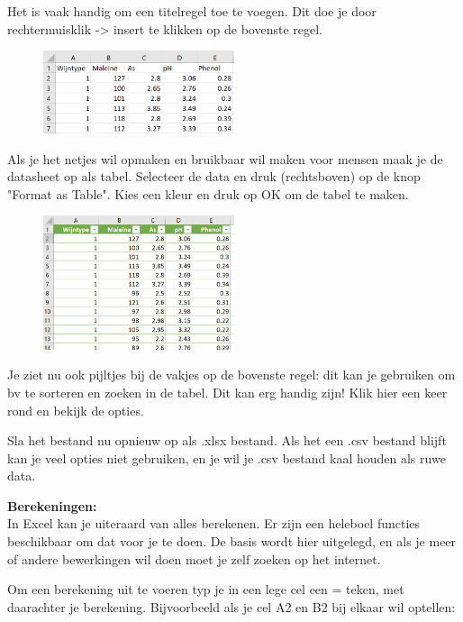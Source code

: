 Het is vaak handig om een titelregel toe te voegen. Dit doe je door rechtermuisklik -> insert te klikken op de bovenste regel.

\begin{figure}[h]
\begin{center}
\includegraphics[width=0.5\textwidth]{img/wijn2.png}
\end{center}
\end{figure}

Als je het netjes wil opmaken en bruikbaar wil maken voor mensen maak je de datasheet op als tabel. Selecteer de data en druk (rechtsboven) op de knop "Format as Table". Kies een kleur en druk op OK om de tabel te maken.
\begin{figure}[h]
\begin{center}
\includegraphics[width=0.5\textwidth]{img/wijn3.png}
\end{center}
\end{figure}

Je ziet nu ook pijltjes bij de vakjes op de bovenste regel: dit kan je gebruiken om bv te sorteren en zoeken in de tabel. Dit kan erg handig zijn! Klik hier een keer rond en bekijk de opties.

Sla het bestand nu opnieuw op als .xlsx bestand. Als het een .csv bestand blijft kan je veel opties niet gebruiken, en je wil je .csv bestand kaal houden als ruwe data. 

\textbf{Berekeningen:}\\
In Excel kan je uiteraard van alles berekenen. Er zijn een heleboel functies beschikbaar om dat voor je te doen. De basis wordt hier uitgelegd, en als je meer of andere bewerkingen wil doen moet je zelf zoeken op het internet.

Om een berekening uit te voeren typ je in een lege cel een = teken, met daarachter je berekening. Bijvoorbeeld als je cel A2 en B2 bij elkaar wil optellen:

